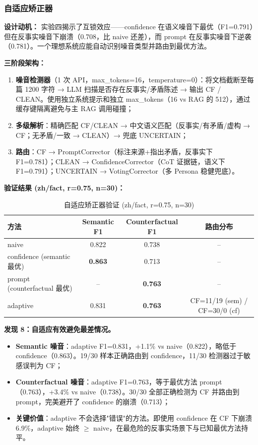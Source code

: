 \documentclass[UTF8,zihao=-4]{ctexart}
\begin{document}
\subsubsection{自适应矫正器}

\textbf{设计动机：} 实验四揭示了互锁效应——confidence 在语义噪音下最优（F1=0.791）但在反事实噪音下崩溃（0.708，比 naive 还差），而 prompt 在反事实噪音下逆袭（0.781）。一个理想系统应能自动识别噪音类型并路由到最优方法。

\textbf{三阶段架构：}

\begin{enumerate}[leftmargin=2.5em, itemsep=0.3em]
  \item \textbf{噪音检测器}（1 次 API，max\_tokens=16，temperature=0）：将文档截断至每篇 1200 字符 → LLM 扫描是否存在反事实/矛盾陈述 → 输出 CF / CLEAN。使用独立系统提示和独立 max\_tokens（16 vs RAG 的 512），通过缓存键隔离避免与主 RAG 调用碰撞；
  \item \textbf{多级解析}：精确匹配 CF/CLEAN → 中文语义匹配（反事实/有矛盾/虚构 → CF；无矛盾/一致 → CLEAN）→ 兜底 UNCERTAIN；
  \item \textbf{路由}：CF → PromptCorrector（标注来源+指出矛盾，反事实下 F1=0.781）；CLEAN → ConfidenceCorrector（CoT 证据链，语义下 F1=0.791）；UNCERTAIN → VotingCorrector（多 Persona 稳健兜底）。
\end{enumerate}

\textbf{验证结果 (zh/fact, r=0.75, n=30)：}

\begin{table}[H]
  \centering
  \caption{自适应矫正器验证 (zh/fact, r=0.75, n=30)}
  \begin{tabular}{lccc}
    \toprule
    方法 & Semantic F1 & Counterfactual F1 & 路由分布 \\
    \midrule
    naive & 0.822 & 0.738 & -- \\
    confidence (semantic 最优) & \textbf{0.863} & 0.713 & -- \\
    prompt (counterfactual 最优) & -- & \textbf{0.763} & -- \\
    \midrule
    adaptive & 0.831 & \textbf{0.763} & CF=11/19 (sem) / CF=30/0 (cf) \\
    \bottomrule
  \end{tabular}
\end{table}

\textbf{发现 8：自适应有效避免最差情况。}
\begin{itemize}
  \item \textbf{Semantic 噪音}：adaptive F1=0.831，+1.1\% vs naive（0.822），略低于 confidence（0.863）。19/30 样本正确路由到 confidence，11/30 检测器过于敏感误判为 CF；
  \item \textbf{Counterfactual 噪音}：adaptive F1=0.763，等于最优方法 prompt（0.763），+3.4\% vs naive（0.738）。30/30 全部正确检测为 CF 并路由到 prompt，完美避开了 confidence 的崩溃（0.713）；
  \item \textbf{关键价值}：adaptive 不会选择"错误"的方法。即使用 confidence 在 CF 下崩溃 6.9\%，adaptive 始终 $\geq$ naive，在最危险的反事实场景下与已知最优方法持平。
\end{itemize}
\end{document}
